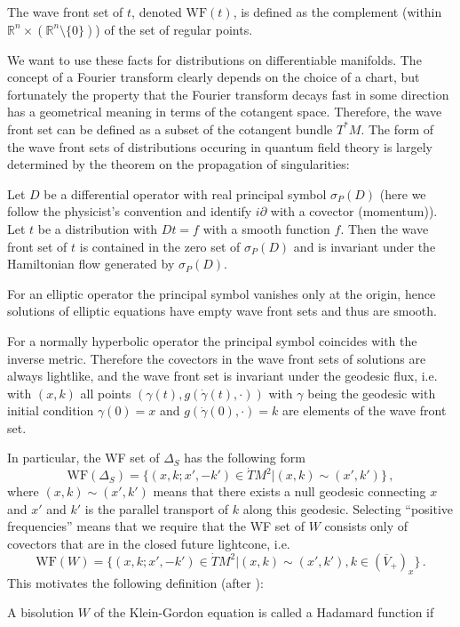 \documentclass[11pt]{article}
\newcommand{\WF}{\mathrm{WF}}         %
\newcommand{\1}{\mathds{1}}                         %
\begin{document}
{{\begin{df}
The {wave front set} of $t$, denoted $\mathrm{WF}(t)$, is defined as the complement (within $\mathbb R^n\times(\mathbb R^n\setminus\{0\})$) of the set of regular points.
\end{df}}
We want to use these facts for distributions on differentiable manifolds. The concept of a Fourier transform clearly depends on the choice of a chart, but fortunately the property that  the Fourier transform decays fast  in some direction has a geometrical meaning in terms of the cotangent space. Therefore,
the wave front set can be defined as a subset of the cotangent bundle $T^*M$. The form of the wave front sets of distributions occuring in quantum field theory is largely determined by the theorem on the propagation of singularities:

{\begin{thm}
Let $D$ be a differential operator with real principal symbol $\sigma_P(D)$ (here we follow the physicist's convention and identify $i\partial$ with a covector (momentum)).
Let $t$ be a distribution with $Dt=f$ with a smooth function $f$. Then the wave front set of $t$ is contained in the zero set of $\sigma_P(D)$ and is invariant under the Hamiltonian flow generated by $\sigma_P(D)$.
\end{thm}}
\begin{itemize}
\item For an elliptic operator the principal symbol vanishes only at the origin, hence solutions of elliptic equations have empty wave front sets and thus are smooth.

{\item For a normally hyperbolic operator the principal symbol coincides with the inverse metric. Therefore the covectors in the wave front sets of solutions are always lightlike, and the wave front set is invariant under the geodesic flux, i.e. with $(x,k)$ all points $(\gamma(t),g(\dot\gamma(t),\cdot))$ with $\gamma$ being the geodesic with initial condition $\gamma(0)=x$ and $g(\dot\gamma(0),\cdot)=k$ are elements of the wave front set.}
\end{itemize}
In particular, the WF set of $\Delta_S$ has the following form
\begin{equation}\label{spectrum0}
\WF(\Delta_S)=\{(x,k;x',-k')\in \dot{T}M^2|(x,k)\sim(x',k')\}\,,
\end{equation}
where $(x,k)\sim(x',k')$ means that there exists a null geodesic connecting $x$ and $x'$ and $k'$ is the parallel transport of $k$ along this geodesic. Selecting ``positive frequencies'' means that we require that the WF set of $W$ consists only of  covectors that are in the closed future lightcone, i.e.
\begin{equation}\label{spectrum}
\WF(W)=\{(x,k;x',-k')\in \dot{T}M^2|(x,k)\sim(x',k'), k\in (\overline{V}_+)_x\}\,.
\end{equation}
This motivates the following definition (after \cite{Rad}):
\begin{df}\label{Hadamard}
A bisolution $W$ of the Klein-Gordon equation is called a Hadamard function if
\begin{enumerate}


\end{enumerate}
\end{df}}
\end{document}
